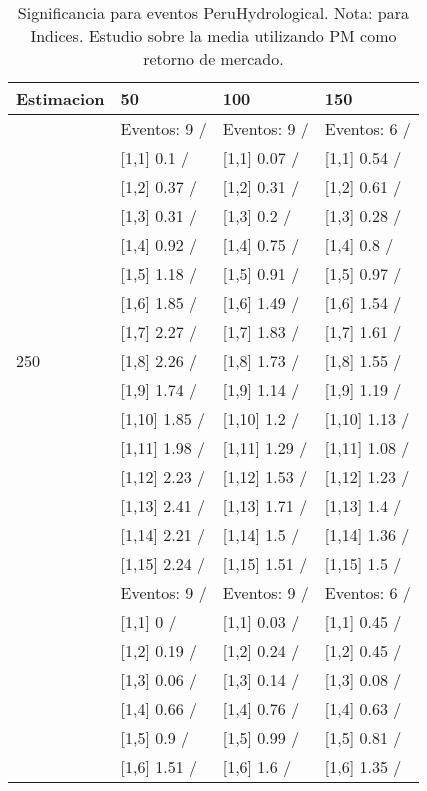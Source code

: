 \begin{table}

\caption{Significancia para eventos PeruHydrological. Nota: para Indices. Estudio sobre la media utilizando PM como retorno de mercado.}
\centering
\begin{tabular}[t]{llll}
\toprule
Estimacion & 50 & 100 & 150\\
\midrule
 & Eventos:  9 / & Eventos:  9 / & Eventos:  6 /\\
 & {}[1,1] 0.1  / & {}[1,1] 0.07  / & {}[1,1] 0.54  /\\
 & {}[1,2] 0.37  / & {}[1,2] 0.31  / & {}[1,2] 0.61  /\\
 & {}[1,3] 0.31  / & {}[1,3] 0.2  / & {}[1,3] 0.28  /\\
 & {}[1,4] 0.92  / & {}[1,4] 0.75  / & {}[1,4] 0.8  /\\
\addlinespace
 & {}[1,5] 1.18  / & {}[1,5] 0.91  / & {}[1,5] 0.97  /\\
 & {}[1,6] 1.85  / & {}[1,6] 1.49  / & {}[1,6] 1.54  /\\
 & {}[1,7] 2.27  / & {}[1,7] 1.83  / & {}[1,7] 1.61  /\\
250 & {}[1,8] 2.26  / & {}[1,8] 1.73  / & {}[1,8] 1.55  /\\
 & {}[1,9] 1.74  / & {}[1,9] 1.14  / & {}[1,9] 1.19  /\\
\addlinespace
 & {}[1,10] 1.85  / & {}[1,10] 1.2  / & {}[1,10] 1.13  /\\
 & {}[1,11] 1.98  / & {}[1,11] 1.29  / & {}[1,11] 1.08  /\\
 & {}[1,12] 2.23  / & {}[1,12] 1.53  / & {}[1,12] 1.23  /\\
 & {}[1,13] 2.41  / & {}[1,13] 1.71  / & {}[1,13] 1.4  /\\
 & {}[1,14] 2.21  / & {}[1,14] 1.5  / & {}[1,14] 1.36  /\\
\addlinespace
 & {}[1,15] 2.24  / & {}[1,15] 1.51  / & {}[1,15] 1.5  /\\
 & Eventos:  9 / & Eventos:  9 / & Eventos:  6 /\\
 & {}[1,1] 0  / & {}[1,1] 0.03  / & {}[1,1] 0.45  /\\
 & {}[1,2] 0.19  / & {}[1,2] 0.24  / & {}[1,2] 0.45  /\\
 & {}[1,3] 0.06  / & {}[1,3] 0.14  / & {}[1,3] 0.08  /\\
\addlinespace
 & {}[1,4] 0.66  / & {}[1,4] 0.76  / & {}[1,4] 0.63  /\\
 & {}[1,5] 0.9  / & {}[1,5] 0.99  / & {}[1,5] 0.81  /\\
 & {}[1,6] 1.51  / & {}[1,6] 1.6  / & {}[1,6] 1.35  /\\

\end{tabular}
\end{table}
